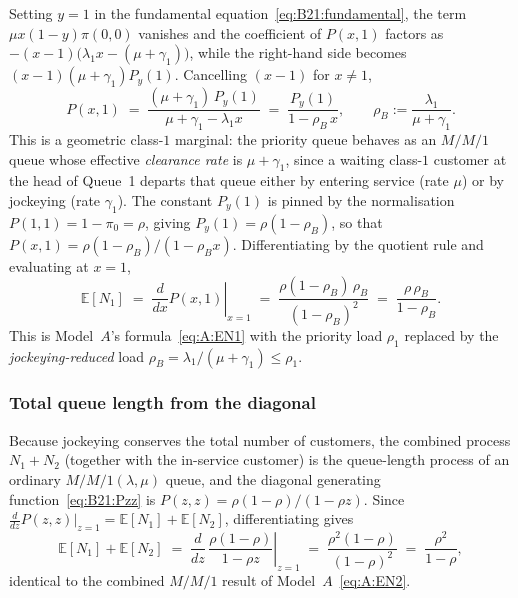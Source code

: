 Setting $y=1$ in the fundamental equation~\eqref{eq:B21:fundamental}, the term
$\mu x(1-y)\pi(0,0)$ vanishes and the coefficient of $P(x,1)$ factors as
$-(x-1)\bigl(\lambda_1 x-(\mu+\gamma_1)\bigr)$, while the right-hand side becomes
$(x-1)(\mu+\gamma_1)P_y(1)$. Cancelling $(x-1)$ for $x\ne1$,
\begin{equation}
    P(x,1) \;=\; \frac{(\mu+\gamma_1)\,P_y(1)}{\mu+\gamma_1-\lambda_1 x}
            \;=\; \frac{P_y(1)}{1-\rho_B\,x},
    \qquad \rho_B := \frac{\lambda_1}{\mu+\gamma_1}.
    \label{eq:B21:Px1}
\end{equation}
This is a geometric class-$1$ marginal: the priority queue behaves as an $M/M/1$ queue whose
effective \emph{clearance rate} is $\mu+\gamma_1$, since a waiting class-$1$ customer at the
head of Queue~1 departs that queue either by entering service (rate $\mu$) or by jockeying
(rate $\gamma_1$). The constant $P_y(1)$ is pinned by the normalisation
$P(1,1)=1-\pi_0=\rho$, giving $P_y(1)=\rho(1-\rho_B)$, so that
$P(x,1)=\rho(1-\rho_B)/(1-\rho_B x)$. Differentiating by the quotient rule and evaluating at
$x=1$,
\begin{equation}
    \mathbb{E}[N_1] \;=\; \left.\frac{d}{dx}P(x,1)\right|_{x=1}
    \;=\; \frac{\rho(1-\rho_B)\,\rho_B}{(1-\rho_B)^2}
    \;=\; \frac{\rho\,\rho_B}{1-\rho_B}.
    \label{eq:B21:EN1}
\end{equation}
This is Model~$A$'s formula~\eqref{eq:A:EN1} with the priority load $\rho_1$ replaced by the
\emph{jockeying-reduced} load $\rho_B=\lambda_1/(\mu+\gamma_1)\le\rho_1$.

\subsubsection{Total queue length from the diagonal}

Because jockeying conserves the total number of customers, the combined process
$N_1+N_2$ (together with the in-service customer) is the queue-length process of an ordinary
$M/M/1(\lambda,\mu)$ queue, and the diagonal generating
function~\eqref{eq:B21:Pzz} is $P(z,z)=\rho(1-\rho)/(1-\rho z)$. Since
$\tfrac{d}{dz}P(z,z)\big|_{z=1}=\mathbb{E}[N_1]+\mathbb{E}[N_2]$, differentiating gives
\begin{equation}
    \mathbb{E}[N_1]+\mathbb{E}[N_2]
    \;=\; \left.\frac{d}{dz}\,\frac{\rho(1-\rho)}{1-\rho z}\right|_{z=1}
    \;=\; \frac{\rho^2(1-\rho)}{(1-\rho)^2}
    \;=\; \frac{\rho^2}{1-\rho},
    \label{eq:B21:EN}
\end{equation}
identical to the combined $M/M/1$ result of Model~$A$~\eqref{eq:A:EN2}.

